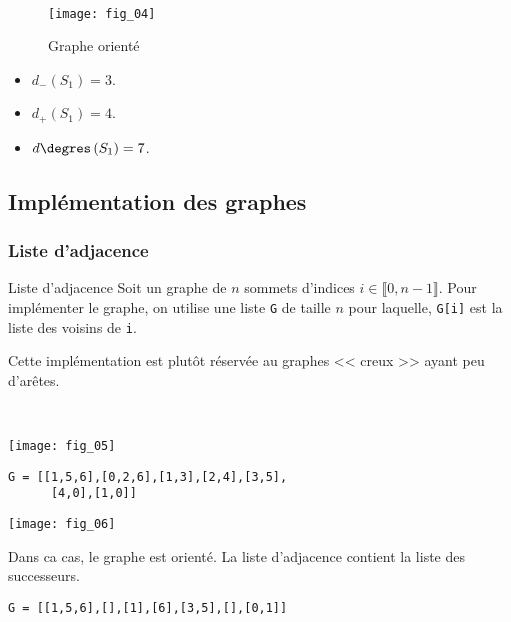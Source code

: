 \begin{exemple}~\\

\begin{multicols}{2}
\begin{figure}[H]
\centering
\texttt{[image: fig\_04]}
\captionsetup{justification=centering}
\caption{Graphe orienté \label{fig_04}}
\end{figure}

\begin{itemize}
\item $d_{-}\left(S_1\right)=3$.
\item $d_{+}\left(S_1\right)=4$.
\item $d\degres\left(S_1\right)=7$.
\end{itemize}
\end{multicols}

\end{exemple}

\subsection{Implémentation des graphes}

\subsubsection{Liste d'adjacence}
\begin{defi}{Liste d'adjacence}
Soit un graphe de $n$ sommets d'indices $i \in \llbracket 0, n-1\rrbracket$. Pour implémenter le graphe, on utilise une liste \texttt{G} de taille $n$ pour laquelle, \texttt{G[i]} est la liste des voisins de \texttt{i}.
\end{defi}
\begin{rem}
Cette implémentation est plutôt réservée au graphes << creux >> ayant peu d'arêtes.
\end{rem}

\begin{exemple} ~\\
\begin{minipage}[b]{.47\linewidth}
\begin{center}
\texttt{[image: fig\_05]}
\end{center}
\begin{lstlisting}
G = [[1,5,6],[0,2,6],[1,3],[2,4],[3,5],
      [4,0],[1,0]]
\end{lstlisting}
\end{minipage}\hfill
\begin{minipage}[b]{.47\linewidth}
\begin{center}
\texttt{[image: fig\_06]}
\end{center}
Dans ca cas, le graphe est orienté. La liste d'adjacence contient la liste des successeurs. 
\begin{lstlisting}
G = [[1,5,6],[],[1],[6],[3,5],[],[0,1]]
\end{lstlisting}
\end{minipage}
\end{exemple}


